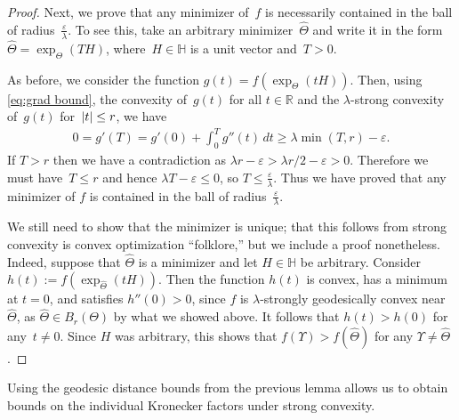 \documentclass[aos]{imsart}
\theoremstyle{definition}
\numberwithin{equation}{section}
\DeclarePairedDelimiter{\abs}{\lvert}{\rvert}
\newcommand{\R}{{\mathbb{R}}}
\renewcommand{\H}{{\mathbb{H}}}
\newcommand{\htheta}{\widehat{\Theta}}
\newcommand{\eps}{\varepsilon}
\newcommand{\AR}[1]{{\color{orange}[AR: #1]}}
\begin{document}
\begin{proof}
Next, we prove that any minimizer of~$f$ is necessarily contained in the ball of radius~$\frac\eps\lambda$.
To see this, take an arbitrary minimizer~$\htheta$ and write it in the form $\htheta = \exp_\Theta(TH)$, where~$H\in \H$ is a unit vector and~$T>0$.


As before, we consider the function $g(t) = f(\exp_\Theta(tH))$.
Then, using \cref{eq:grad bound}, the convexity of~$g(t)$ for all $t\in\R$ and the $\lambda$-strong convexity of~$g(t)$ for~$\abs t \leq  r$, we have
\begin{align*}
  0 = g'(T) = g'(0) + \int_0^T g''(t) \, dt \geq \lambda \min(T,  r) - \eps.
\end{align*}
If $T> r$ then we have a contradiction as $\lambda r - \eps > \lambda r/2 - \eps > 0$.
Therefore we must have~$T\leq r$ and hence $\lambda T - \eps \leq 0$, so $T \leq \frac\eps\lambda$.
Thus we have proved that any minimizer of $f$ is contained in the ball of radius~$\frac\eps\lambda$.

We still need to show that the minimizer is unique; that this follows from strong convexity is convex optimization ``folklore,'' but we include a proof nonetheless.
Indeed, suppose that $\htheta$ is a minimizer and let $H\in \H$ be arbitrary.
Consider $h(t) := f(\exp_{\htheta}(tH))$.
Then the function $h(t)$ is convex, has a minimum at $t=0$, and satisfies $h''(0) > 0$, since $f$ is $\lambda$-strongly geodesically convex near~$\htheta$, as $\htheta \in B_r(\Theta)$ by what we showed above.
It follows that $h(t) > h(0)$ for any~$t\neq0$.
Since $H$ was arbitrary, this shows that $f(\Upsilon) > f(\htheta)$ for any $\Upsilon\neq \htheta$.
\end{proof}
Using the geodesic distance bounds from the previous lemma allows us to obtain bounds on the individual Kronecker factors under strong convexity.
\end{document}
